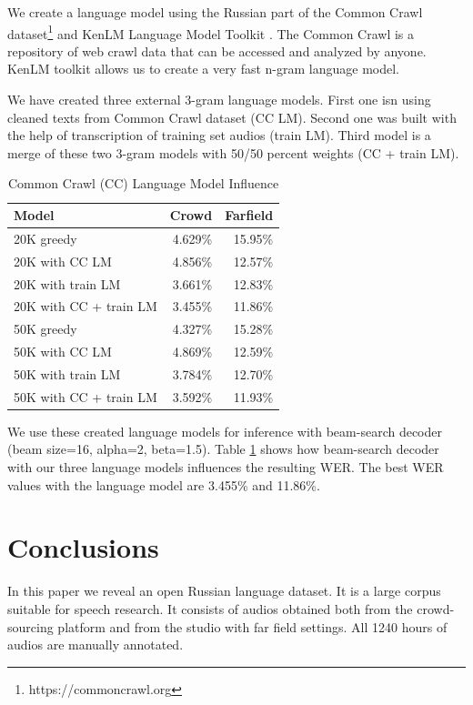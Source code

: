 \documentclass[a4paper]{article}
\begin{document}
We create a language model using the Russian part of the Common Crawl dataset\footnote{https://commoncrawl.org} and KenLM Language Model Toolkit \cite{heafield-2011-kenlm}. The Common Crawl is a repository of web crawl data that can be accessed and analyzed by anyone. KenLM toolkit allows us to create a very fast n-gram language model.

We have created three external 3-gram language models. First one isn using cleaned texts from Common Crawl dataset (CC LM). Second one was built with the help of transcription of training set audios (train LM). Third model is a merge of these two 3-gram models with 50/50 percent weights (CC + train LM).

\begin{table}[t]
  \caption{Common Crawl (CC) Language Model Influence}
  \label{tab:language_model}
  \centering
  \begin{tabular}{lrr}
    \toprule
    \textbf{Model}      & \textbf{Crowd}     & \textbf{Farfield} \\
    \midrule
    20K greedy & 4.629\% & 15.95\%    \\
    20K with CC LM & 4.856\% & 12.57\%   \\
    20K with train LM & 3.661\% & 12.83\%   \\
    20K with CC + train LM & 3.455\% & 11.86\%   \\
    
    \midrule
    50K greedy & 4.327\% & 15.28\%   \\
    50K with CC LM & 4.869\% & 12.59\%   \\
    50K with train LM & 3.784\% & 12.70\%   \\
    50K with CC + train LM & 3.592\% & 11.93\%   \\
    \bottomrule
  \end{tabular}
\end{table}

We use these created language models for inference with beam-search decoder (beam size=16, alpha=2, beta=1.5). Table \ref{tab:language_model} shows how beam-search decoder with our three language models influences the resulting WER. The best WER values with the language model are 3.455\% and 11.86\%. 


\section{Conclusions}

In this paper we reveal an open Russian language dataset. It is a large corpus suitable for speech research. It consists of audios obtained both from the crowd-sourcing platform and from the studio with far field settings. All 1240 hours of audios are manually annotated.
\end{document}
